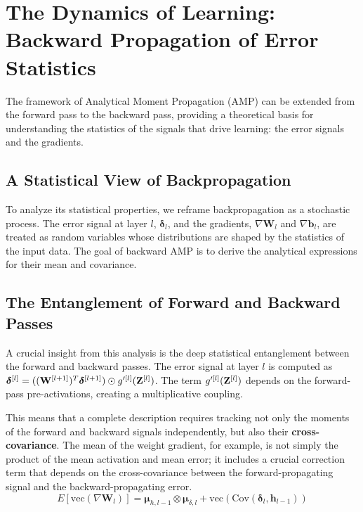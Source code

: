 \section{The Dynamics of Learning: Backward Propagation of Error Statistics}
\label{sec:backward_dynamics}

The framework of Analytical Moment Propagation (AMP) can be extended from the forward pass to the backward pass, providing a theoretical basis for understanding the statistics of the signals that drive learning: the error signals and the gradients.

\subsection{A Statistical View of Backpropagation}
To analyze its statistical properties, we reframe backpropagation as a stochastic process. The error signal at layer $l$, $\boldsymbol{\delta}_l$, and the gradients, $\nabla\mathbf{W}_l$ and $\nabla\mathbf{b}_l$, are treated as random variables whose distributions are shaped by the statistics of the input data. The goal of backward AMP is to derive the analytical expressions for their mean and covariance.

\subsection{The Entanglement of Forward and Backward Passes}
A crucial insight from this analysis is the deep statistical entanglement between the forward and backward passes. The error signal at layer $l$ is computed as $\boldsymbol{\delta}^{[l]} = ((\mathbf{W}^{[l+1]})^T \boldsymbol{\delta}^{[l+1]}) \odot g'^{[l]}(\mathbf{Z}^{[l]})$. The term $g'^{[l]}(\mathbf{Z}^{[l]})$ depends on the forward-pass pre-activations, creating a multiplicative coupling.

This means that a complete description requires tracking not only the moments of the forward and backward signals independently, but also their \textbf{cross-covariance}. The mean of the weight gradient, for example, is not simply the product of the mean activation and mean error; it includes a crucial correction term that depends on the cross-covariance between the forward-propagating signal and the backward-propagating error.
\begin{equation}
E[\text{vec}(\nabla\mathbf{W}_l)] = \boldsymbol{\mu}_{h,l-1} \otimes \boldsymbol{\mu}_{\delta,l} + \text{vec}(\text{Cov}(\boldsymbol{\delta}_l, \mathbf{h}_{l-1}))
\end{equation}

